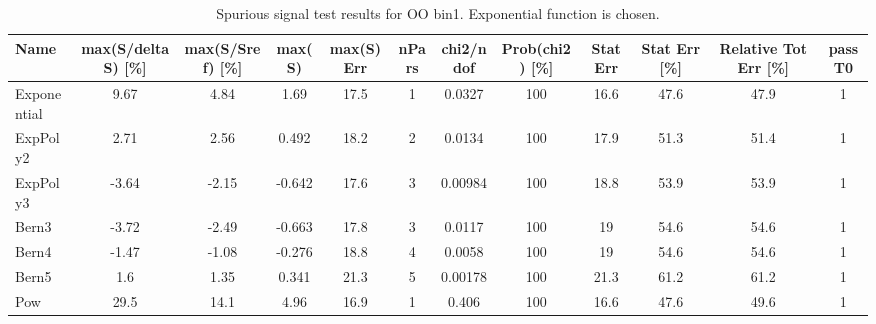 \clearpage
\begin{landscape}

\begin{table}[]
\footnotesize
\begin{tabular}{l|ccccccccccc}
Name        & max(S/deltaS) {[}\%{]} & max(S/Sref) {[}\%{]} & max(S) & max(S) Err & nPars & chi2/ndof & Prob(chi2) {[}\%{]} & Stat Err & Stat Err {[}\%{]} & Relative Tot Err {[}\%{]} & passT0 \\ \hline
Exponential & 9.67                   & 4.84                 & 1.69   & 17.5       & 1     & 0.0327    & 100                 & 16.6     & 47.6              & 47.9                      & 1      \\
ExpPoly2    & 2.71                   & 2.56                 & 0.492  & 18.2       & 2     & 0.0134    & 100                 & 17.9     & 51.3              & 51.4                      & 1      \\
ExpPoly3    & -3.64                  & -2.15                & -0.642 & 17.6       & 3     & 0.00984   & 100                 & 18.8     & 53.9              & 53.9                      & 1      \\
Bern3       & -3.72                  & -2.49                & -0.663 & 17.8       & 3     & 0.0117    & 100                 & 19       & 54.6              & 54.6                      & 1      \\
Bern4       & -1.47                  & -1.08                & -0.276 & 18.8       & 4     & 0.0058    & 100                 & 19       & 54.6              & 54.6                      & 1      \\
Bern5       & 1.6                    & 1.35                 & 0.341  & 21.3       & 5     & 0.00178   & 100                 & 21.3     & 61.2              & 61.2                      & 1      \\
Pow         & 29.5                   & 14.1                 & 4.96   & 16.9       & 1     & 0.406     & 100                 & 16.6     & 47.6              & 49.6                      & 1      \\
\end{tabular}
\caption{Spurious signal test results for OO bin1. Exponential function is chosen.}
\label{tab:SSbin1}
\end{table}


\end{landscape}
